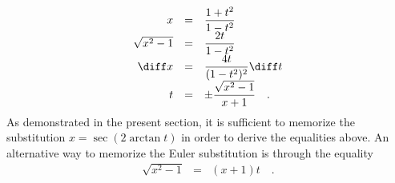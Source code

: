 \begin{frame}
\[
\begin{array}{rcl}
x&=&\displaystyle \frac{1+t^2}{1-t^2}\\
\sqrt{x^2-1}&=&\displaystyle \frac{2t}{1-t^2}  \\
\diff x&=&\displaystyle  \frac{4 t}{(1- t^{2})^{2}} \diff t\\
t&=&\displaystyle \pm \frac{ \sqrt{x^2-1}}{x+1} \quad .
\end{array}
\]
As demonstrated in the present section, it is sufficient to memorize the substitution $x=\sec (2\arctan t)$ in order to derive the equalities above. An alternative way to memorize the Euler substitution is through the equality
\[
\begin{array}{rcl}
\sqrt{x^2-1}&=&(x+1)t\quad .
\end{array}
\]
\end{frame}